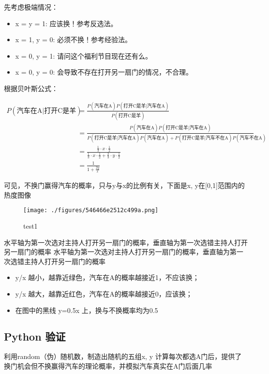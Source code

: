 先考虑极端情况：

\begin{itemize}
\item x = y = 1: 应该换！参考反选法。
\item x = 1, y = 0: 必须不换！参考经验法。
\item x = 0, y = 1: 请问这个福利节目现在还有么。
\item x = 0, y = 0: 会导致不存在打开另一扇门的情况，不合理。
\end{itemize}

根据贝叶斯公式：

\begin{align}
\nonumber
P(\text{汽车在A}|\text{打开C是羊})&=\frac{P(\text{汽车在A})P(\text{打开C是羊}|\text{汽车在A})}{P(\text{打开C是羊})}\\
\nonumber
&=\frac{P(\text{汽车在A})P(\text{打开C是羊}|\text{汽车在A})}{P(\text{打开C是羊}|\text{汽车在A})P(\text{汽车在A})+P(\text{打开C是羊}|\text{汽车不在A})P(\text{汽车不在A})}\\
\nonumber
&=\frac{\frac{1}{3}\cdot x\cdot \frac{1}{2}}{\frac{1}{3}\cdot x\cdot \frac{1}{2}+\frac{2}{3}\cdot y\cdot \frac{1}{2}}\\
\nonumber
&=\frac{1}{1+\frac{2y}{x}}
\end{align}

可见，不换门赢得汽车的概率，只与y与x的比例有关，下面是x, y在[0,1]范围内的热度图像

\begin{figure}[ht]
\centering
\texttt{[image: ./figures/546466e2512c499a.png]}
\caption{test1} \label {fig_MontyH}
\end{figure}


水平轴为第一次选对主持人打开另一扇门的概率，垂直轴为第一次选错主持人打开另一扇门的概率
水平轴为第一次选对主持人打开另一扇门的概率，垂直轴为第一次选错主持人打开另一扇门的概率

\begin{itemize}
\item y/x 越小，越靠近绿色，汽车在A的概率越接近1，不应该换；
\item y/x 越大，越靠近红色，汽车在A的概率越接近0，应该换；
\item 在图中的黑线 y=0.5x 上，换与不换概率均为0.5
\end{itemize}

\subsection{Python 验证}
利用random（伪）随机数，制造出随机的五组x, y 计算每次都选A门后，提供了换门机会但不换赢得汽车的理论概率，并模拟汽车真实在A门后面几率


